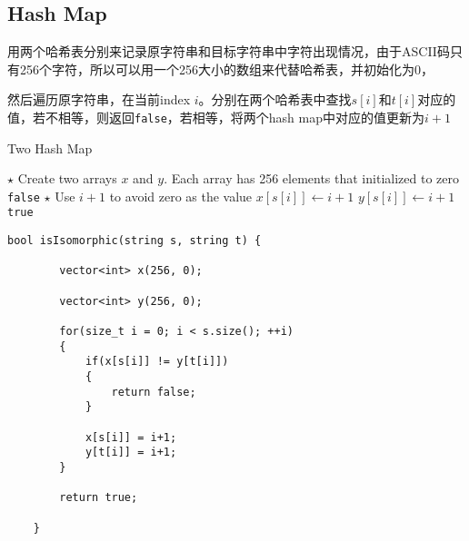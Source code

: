 \subsection{Hash Map}
\begin{CJK*}{UTF8}{gbsn}
用两个哈希表分别来记录原字符串和目标字符串中字符出现情况，由于ASCII码只有256个字符，所以可以用一个256大小的数组来代替哈希表，并初始化为0，
\par
然后遍历原字符串，在当前index $i$。分别在两个哈希表中查找$s[i]$和$t[i]$对应的值，若不相等，则返回\texttt{false}，若相等，将两个hash map中对应的值更新为$i + 1$
\end{CJK*}
\setcounter{algorithm}{0}
\begin{algorithm}[H]
\caption{Two Hash Map}
\begin{algorithmic}[1]
\State $\star$ Create two arrays $x$ and $y$. Each array has 256 elements that initialized to zero
\State \Return \texttt{false}
\EndIf
\State $\star$ Use $i+1$ to avoid zero as the value
\State $x[s[i]]\gets i+1$ 
\State $y[s[i]]\gets i+1$
\EndFor
\State \Return \texttt{true}
\EndProcedure
\end{algorithmic}
\end{algorithm}
\setcounter{lstlisting}{0}
\begin{lstlisting}[style=customc, caption={Two Hash Maps}]
  bool isIsomorphic(string s, string t) {

        vector<int> x(256, 0);

        vector<int> y(256, 0);
        
        for(size_t i = 0; i < s.size(); ++i)
        {
            if(x[s[i]] != y[t[i]])
            {
                return false;
            }
            
            x[s[i]] = i+1;
            y[t[i]] = i+1;
        }

        return true;
        
    }
\end{lstlisting}
